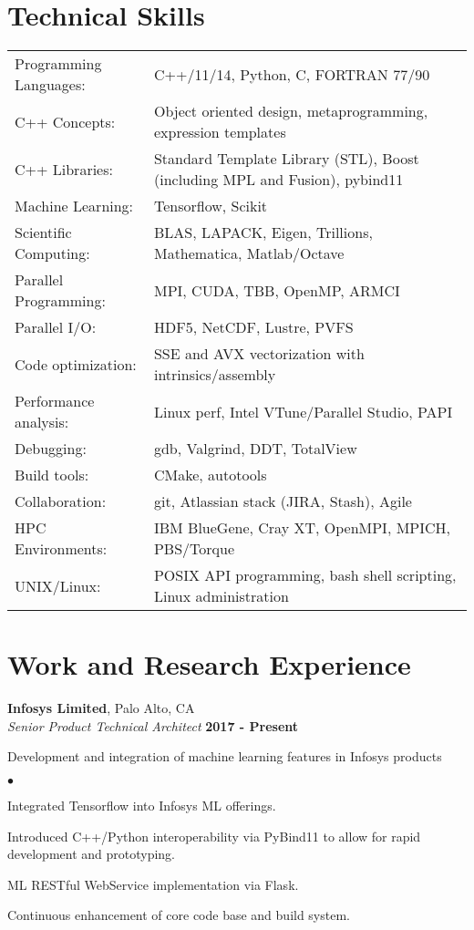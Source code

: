 \documentclass[overlap,line]{cv}
\newenvironment{list2}{
  \begin{list}{$\bullet$}{%
      \setlength{\itemsep}{0in}
      \setlength{\parsep}{0in} \setlength{\parskip}{0in}
      \setlength{\topsep}{0in} \setlength{\partopsep}{0in} 
      \setlength{\leftmargin}{0.2in}}}{\end{list}}
\begin{document}
\begin{resume}
\section{\sc Technical Skills}
\vspace{.05in}
\begin{tabular}{ l @{\hskip 1em} l }
Programming Languages: & C++/11/14, Python, C, FORTRAN 77/90 \\
C++ Concepts: & Object oriented design, metaprogramming, expression templates \\
C++ Libraries: & Standard Template Library (STL), Boost (including MPL and Fusion), pybind11 \\
Machine Learning: & Tensorflow, Scikit \\
Scientific Computing: & BLAS, LAPACK, Eigen, Trillions, Mathematica, Matlab/Octave \\
Parallel Programming: & MPI, CUDA, TBB, OpenMP, ARMCI \\
Parallel I/O: & HDF5, NetCDF, Lustre, PVFS \\
Code optimization: & SSE and AVX vectorization with intrinsics/assembly \\
Performance analysis: & Linux perf, Intel VTune/Parallel Studio, PAPI \\
Debugging: & gdb, Valgrind, DDT, TotalView \\
Build tools: & CMake, autotools \\
Collaboration: & git, Atlassian stack (JIRA, Stash), Agile \\
HPC Environments: & IBM BlueGene, Cray XT, OpenMPI, MPICH, PBS/Torque \\
UNIX/Linux: & POSIX API programming, bash shell scripting, Linux administration \\
\end{tabular}


\section{\sc Work and Research Experience}
\vspace{.05in}
{\bf Infosys Limited}, Palo Alto, CA \\
{\it Senior Product Technical Architect} \hfill {\bf 2017 - Present}

Development and integration of machine learning features in Infosys products
\vspace{.05in}
\begin{list2}
\item Integrated Tensorflow into Infosys ML offerings.
\item Introduced C++/Python interoperability via PyBind11 to allow for rapid development and prototyping.
\item ML RESTful WebService implementation via Flask.
\item Continuous enhancement of core code base and build system.
\end{list2}


\end{resume}
\end{document}
